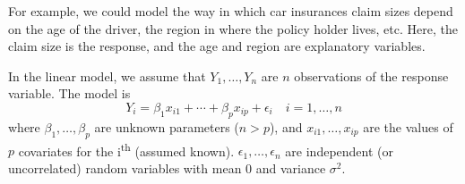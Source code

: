 For example, we could model the way in which car insurances claim sizes depend on the age of the driver, the region in where the policy holder lives, etc.
Here, the claim size is the response, and the age and region are explanatory variables.

In the linear model, we assume that $Y_1, \dotsc, Y_n$ are $n$ observations of the response variable. The model is
\begin{equation}
  \label{eq:3.3}
Y_i  = \beta_1 x_{i1} + \dotsb + \beta_p x_{ip} + \epsilon_i \quad i = 1, \dotsc, n
\end{equation}
where $\beta_1, \dotsc, \beta_p$ are unknown parameters ($n > p$), and $x_{i1}, \dotsc, x_{ip}$ are the values of $p$ covariates for the i\textsuperscript{th} (assumed known).
$\epsilon_1, \dotsc, \epsilon_n$ are independent (or uncorrelated) random variables with mean $0$ and variance $\sigma^2$.

